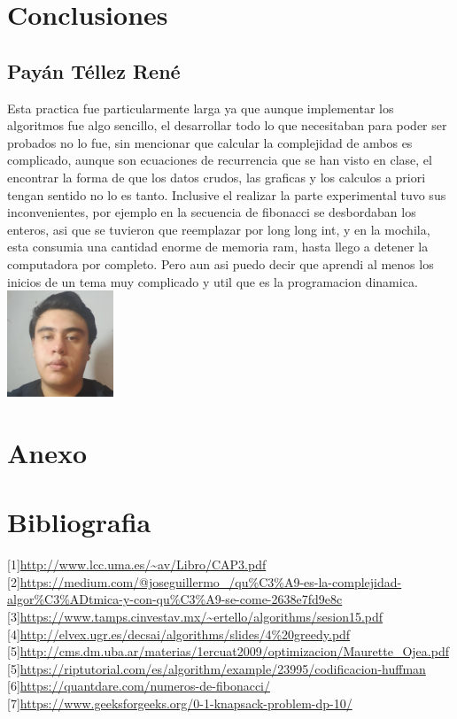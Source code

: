 \documentclass[spanish]{article}
\begin{document}
	\section{Conclusiones}			
	\subsection{Payán Téllez René}
	Esta practica fue particularmente larga ya que aunque implementar los algoritmos fue algo sencillo, el desarrollar todo lo que necesitaban para poder ser probados no lo fue, sin mencionar que calcular la complejidad de ambos es complicado, aunque son ecuaciones de recurrencia que se han visto en clase, el encontrar la forma de que los datos crudos, las graficas y los calculos a priori tengan sentido no lo es tanto. Inclusive el realizar la parte experimental tuvo sus inconvenientes, por ejemplo en la secuencia de fibonacci se desbordaban los enteros, asi que se tuvieron que reemplazar por long long int, y en la mochila, esta consumia una cantidad enorme de memoria ram, hasta llego a detener la computadora por completo. Pero aun asi puedo decir que aprendi al menos los inicios de un tema muy complicado y util que es la programacion dinamica.\\
	\includegraphics[height=120px,width=120px]{Rene}
	\section{Anexo}			
	\section{Bibliografia}
		{[}1{]}\url{http://www.lcc.uma.es/~av/Libro/CAP3.pdf}\\
		{[}2{]}\url{https://medium.com/@joseguillermo_/qu\%C3\%A9-es-la-complejidad-algor\%C3\%ADtmica-y-con-qu\%C3\%A9-se-come-2638e7fd9e8c}\\
		{[}3{]}\url{https://www.tamps.cinvestav.mx/~ertello/algorithms/sesion15.pdf	}\\		
		{[}4{]}\url{http://elvex.ugr.es/decsai/algorithms/slides/4\%20greedy.pdf}\\			
		{[}5{]}\url{http://cms.dm.uba.ar/materias/1ercuat2009/optimizacion/Maurette_Ojea.pdf}\\
		{[}5{]}\url{https://riptutorial.com/es/algorithm/example/23995/codificacion-huffman}\\	
		{[}6{]}\url{https://quantdare.com/numeros-de-fibonacci/}\\	
		{[}7{]}\url{https://www.geeksforgeeks.org/0-1-knapsack-problem-dp-10/}\\			
	
\end{document}
